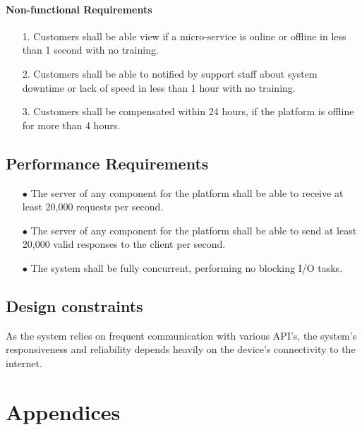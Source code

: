 \documentclass{scrreprt}
\begin{document}
\subsubsection{Non-functional Requirements}
\begin{enumerate}
	\item[1.] Customers shall be able view if a micro-service is online or offline in less than 1 second with no training.
	\item[2.] Customers shall be able to notified by support staff about system downtime or lack of speed in less than 1 hour with no training.
	\item[3.] Customers shall be compensated within 24 hours, if the platform is offline for more than 4 hours.
\end{enumerate}


\section{Performance Requirements}
\begin{enumerate}
	\item[$\bullet$] The server of any component for the platform shall be able to receive at least 20,000 requests per second.
	\item[$\bullet$] The server of any component for the platform shall be able to send at least 20,000 valid responses to the client per second.
	\item[$\bullet$] The system shall be fully concurrent, performing no blocking I/O tasks.
\end{enumerate}


\section{Design constraints}
As the system relies on frequent communication with various API's, the system's responsiveness and reliability depends heavily on the device's connectivity to the internet.

\chapter{Appendices}
\end{document}
